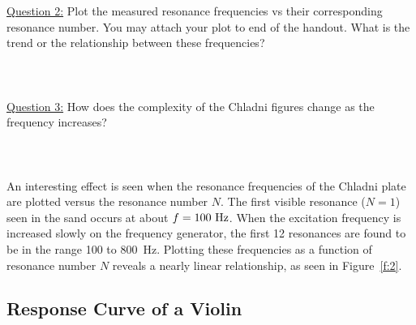 \documentclass[11pt]{NSF}
\begin{document}
\underline{Question 2:}
Plot the measured resonance frequencies vs their corresponding resonance number. You may attach your plot to end of the handout. What is the trend or the relationship
between these frequencies? \\
\\
\\
\\


\underline{Question 3:}
How does the complexity of the Chladni figures change as the frequency increases?
\\
\\
\\
\\

An interesting effect is seen when the resonance frequencies of the
Chladni plate are plotted versus the resonance number $N$. The first
visible resonance ($N = 1$) seen in the sand occurs at about 
$f = 100 ~{\rm Hz}$.
When the excitation frequency is increased slowly on the frequency
generator, the first 12 resonances are found to be in the range 100 to
800~Hz. Plotting these frequencies as a function of resonance number
$N$ reveals a nearly linear relationship, as seen in Figure~\ref{f:2}. 

\subsection{Response Curve of a Violin}
\end{document}
